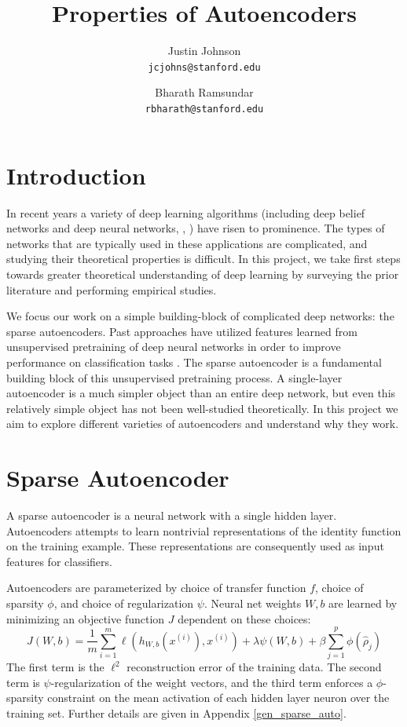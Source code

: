\documentclass[twocolumn]{article}
\title{Properties of Autoencoders}
\author{%
    Justin Johnson \\
    \texttt{jcjohns@stanford.edu}
  \and
    Bharath Ramsundar \\
    \texttt{rbharath@stanford.edu}
}
\date{}
\newcommand{\xii}{x^{(i)}}
\begin{document}
\maketitle

\section{Introduction}
In recent years a variety of deep learning algorithms (including deep belief
networks \cite{hinton2006fast,lee2009convolutional} and deep neural networks,
\cite{krizhevsky2012imagenet}, \cite{le2011building}) have risen to prominence.
The types of networks that are typically used in these applications are 
complicated, and studying their theoretical properties is difficult. In this
project, we take first steps towards greater theoretical understanding of
deep learning by surveying the prior literature and performing empirical
studies.

We focus our work on a simple building-block of complicated deep networks: the
sparse autoencoders. Past approaches have utilized features learned from
unsupervised pretraining of deep neural networks in order to improve performance
on classification tasks \cite{le2011building}. The sparse autoencoder is a
fundamental building block of this unsupervised pretraining process. A
single-layer autoencoder is a much simpler object than an entire deep network,
but even this relatively simple object has not been well-studied theoretically.
In this project we aim to explore different varieties of autoencoders and
understand why they work.

\section{Sparse Autoencoder} A sparse autoencoder is a neural network with a
single hidden layer. Autoencoders attempts to learn nontrivial representations
of the identity function on the training example. These representations are
consequently used as input features for classifiers. 

Autoencoders are parameterized by choice of transfer function $f$, choice of
sparsity $\phi$, and choice of regularization $\psi$.  Neural net weights $W,b$
are learned by minimizing an objective function $J$ dependent on these choices:
\[J(W,b)=\frac1m\sum_{i=1}^m\ell(h_{W,b}(\xii),\xii)+\lambda\psi(W,b)+\beta\sum_{j=1}^p\phi(\hat\rho_j)\]
The first term is the $\ell^2$ reconstruction error of the training
data. The second term is $\psi$-regularization of the weight vectors, and the
third term enforces a $\phi$-sparsity constraint on the mean activation of each hidden layer neuron over the training set. Further details are given in Appendix
\ref{gen_sparse_auto}.
\end{document}
